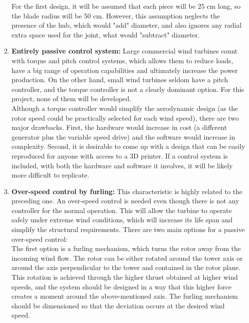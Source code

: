 \documentclass[../TFG_Report.tex]{subfiles}
\begin{document}
\begin{enumerate}
For the first design, it will be assumed that each piece will be 25 cm long, so the blade radius will be 50 cm. However, this assumption neglects the presence of the hub, which would "add" diameter, and also ignores any radial extra space used for the joint, what would "subtract" diameter. \\

\item \textbf{Entirely passive control system: } Large commercial wind turbines count with torque and pitch control systems, which allows them to reduce loads, have a big range of operation capabilities and ultimately increase the power production. On the other hand, small wind turbines seldom have a pitch controller, and the torque controller is not a clearly dominant option. For this project, none of them will be developed. \\

Although a torque controller would simplify the aerodynamic design (as the rotor speed could be practically selected for each wind speed), there are two major drawbacks. First, the hardware would increase in cost (a different generator plus the variable speed drive) and the software would increase in complexity. Second, it is desirable to come up with a design that can be easily reproduced for anyone with access to a 3D printer. If a control system is included, with both the hardware and software it involves, it will be likely more difficult to replicate. \\


\item \textbf{Over-speed control by furling: } This characteristic is highly related to the preceding one. An over-speed control is needed even though there is not any controller for the normal operation. This will allow the turbine to operate safely under extreme wind conditions, which will increase its life span and simplify the structural requirements. There are two main options for a passive over-speed control: \\

The first option is a furling mechanism, which turns the rotor away from the incoming wind flow. The rotor can be either rotated around the tower axis or around the axis perpendicular to the tower and contained in the rotor plane. This rotation is achieved through the higher thrust obtained at higher wind speeds, and the system should be designed in a way that this higher force creates a moment around the above-mentioned axis. The furling mechanism should be dimensioned so that the deviation occurs at the desired wind speed. \\


\end{enumerate}
\end{document}
